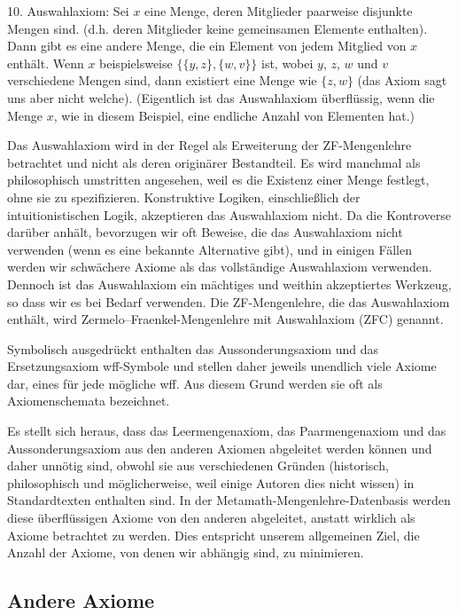 10. Auswahlaxiom:  Sei $x$ eine Menge, deren Mitglieder paarweise disjunkte Mengen sind. (d.h. deren Mitglieder keine gemeinsamen Elemente enthalten).  Dann gibt es eine andere Menge, die ein Element von jedem Mitglied von $x$ enthält.  Wenn $x$ beispielsweise $\{\{y,z\},\{w,v\}\}$ ist, wobei $y$, $z$, $w$ und $v$ verschiedene Mengen sind, dann existiert eine Menge wie $\{z,w\}$ (das Axiom sagt uns aber nicht welche).  (Eigentlich ist das Auswahlaxiom überflüssig, wenn die Menge $x$, wie in diesem Beispiel, eine endliche Anzahl von Elementen hat.)

Das Auswahlaxiom wird in der Regel als Erweiterung der ZF-Mengenlehre betrachtet und nicht als deren originärer Bestandteil.  Es wird manchmal als philosophisch umstritten angesehen, weil es die Existenz einer Menge festlegt, ohne sie zu spezifizieren. Konstruktive Logiken, einschließlich der intuitionistischen Logik, akzeptieren das Auswahlaxiom nicht. Da die Kontroverse darüber anhält, bevorzugen wir oft Beweise, die das Auswahlaxiom nicht verwenden (wenn es eine bekannte Alternative gibt), und in einigen Fällen werden wir schwächere Axiome als das vollständige Auswahlaxiom verwenden. Dennoch ist das Auswahlaxiom ein mächtiges und weithin akzeptiertes Werkzeug, so dass wir es bei Bedarf verwenden. Die ZF-Mengenlehre, die das Auswahlaxiom enthält, wird Zermelo--Fraenkel-Mengenlehre mit Auswahlaxiom (ZFC) genannt.

Symbolisch ausgedrückt enthalten das Aussonderungsaxiom und das Ersetzungsaxiom wff-Symbole und stellen daher jeweils unendlich viele Axiome dar, eines für jede mögliche wff. Aus diesem Grund werden sie oft als Axiomenschemata bezeichnet.

Es stellt sich heraus, dass das Leermengenaxiom, das Paarmengenaxiom und das Aussonderungsaxiom aus den anderen Axiomen abgeleitet werden können und daher unnötig sind, obwohl sie aus verschiedenen Gründen (historisch, philosophisch und möglicherweise, weil einige Autoren dies nicht wissen) in Standardtexten enthalten sind.  In der Metamath-Mengenlehre-Datenbasis werden diese überflüssigen Axiome von den anderen abgeleitet, anstatt wirklich als Axiome betrachtet zu werden. Dies entspricht unserem allgemeinen Ziel, die Anzahl der Axiome, von denen wir abhängig sind, zu minimieren.

\subsection{Andere Axiome}

